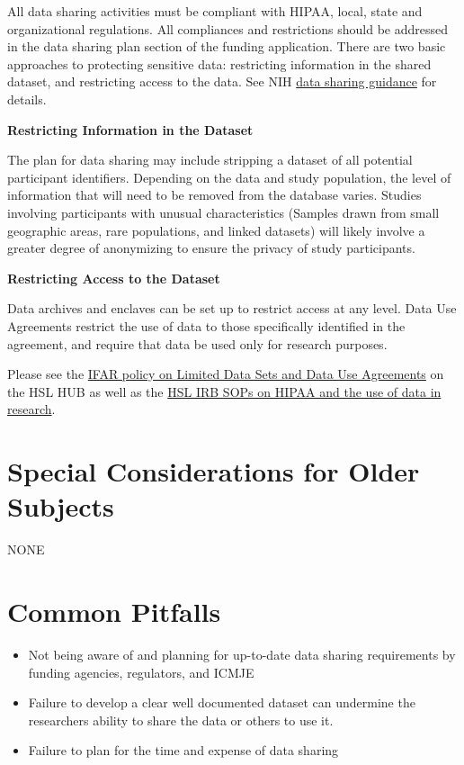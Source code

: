 \documentclass[]{book}
\providecommand{\tightlist}{%
  \setlength{\itemsep}{0pt}\setlength{\parskip}{0pt}}
\theoremstyle{definition}
\theoremstyle{definition}
\theoremstyle{definition}
\theoremstyle{remark}
\begin{document}
All data sharing activities must be compliant with HIPAA, local, state
and organizational regulations. All compliances and restrictions should
be addressed in the data sharing plan section of the funding
application. There are two basic approaches to protecting sensitive
data: restricting information in the shared dataset, and restricting
access to the data. See NIH
\href{\%3Chttps://grants.nih.gov/grants/policy/data_sharing/data_sharing_guidance.htm\#methods}{data
sharing guidance} for details.

\textbf{Restricting Information in the Dataset}

The plan for data sharing may include stripping a dataset of all
potential participant identifiers. Depending on the data and study
population, the level of information that will need to be removed from
the database varies. Studies involving participants with unusual
characteristics (Samples drawn from small geographic areas, rare
populations, and linked datasets) will likely involve a greater degree
of anonymizing to ensure the privacy of study participants.

\textbf{Restricting Access to the Dataset}

Data archives and enclaves can be set up to restrict access at any
level. Data Use Agreements restrict the use of data to those
specifically identified in the agreement, and require that data be used
only for research purposes.

Please see the
\href{http://thehslhub/Departments/Roslindale/HSL-IFAR/Administration/Policies-and-Forms}{IFAR
policy on Limited Data Sets and Data Use Agreements} on the HSL HUB as
well as the
\href{http://thehslhub/Forms/Documents-and-Forms/IFAR/IFAR-IRB-SOP}{HSL
IRB SOPs on HIPAA and the use of data in research}.

\section{Special Considerations for Older
Subjects}\label{special-considerations-for-older-subjects-14}

NONE

\section{Common Pitfalls}\label{common-pitfalls-16}

\begin{itemize}
\tightlist
\item
  Not being aware of and planning for up-to-date data sharing
  requirements by funding agencies, regulators, and ICMJE
\item
  Failure to develop a clear well documented dataset can undermine the
  researchers ability to share the data or others to use it.
\item
  Failure to plan for the time and expense of data sharing
\end{itemize}
\end{document}

